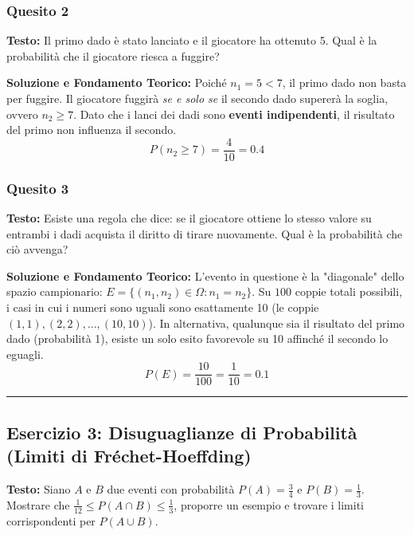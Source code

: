 \documentclass[12pt, a4paper]{article}
\begin{document}
\subsubsection*{Quesito 2}
\textbf{Testo:} Il primo dado è stato lanciato e il giocatore ha ottenuto 5. Qual è la probabilità che il giocatore riesca a fuggire?

\textbf{Soluzione e Fondamento Teorico:} 
Poiché $n_1 = 5 < 7$, il primo dado non basta per fuggire. Il giocatore fuggirà \textit{se e solo se} il secondo dado supererà la soglia, ovvero $n_2 \ge 7$. Dato che i lanci dei dadi sono \textbf{eventi indipendenti}, il risultato del primo non influenza il secondo.
$$ P(n_2 \ge 7) = \frac{4}{10} = 0.4 $$

\subsubsection*{Quesito 3}
\textbf{Testo:} Esiste una regola che dice: se il giocatore ottiene lo stesso valore su entrambi i dadi acquista il diritto di tirare nuovamente. Qual è la probabilità che ciò avvenga?

\textbf{Soluzione e Fondamento Teorico:} 
L'evento in questione è la "diagonale" dello spazio campionario: $E = \{(n_1, n_2) \in \Omega : n_1 = n_2\}$.
Su $100$ coppie totali possibili, i casi in cui i numeri sono uguali sono esattamente 10 (le coppie $(1,1), (2,2), \dots, (10,10)$). In alternativa, qualunque sia il risultato del primo dado (probabilità 1), esiste un solo esito favorevole su 10 affinché il secondo lo eguagli.
$$ P(E) = \frac{10}{100} = \frac{1}{10} = 0.1 $$

\vspace{0.5cm}\hrule\vspace{0.5cm}

\subsection*{Esercizio 3: Disuguaglianze di Probabilità (Limiti di Fréchet-Hoeffding)}
\textbf{Testo:} Siano $A$ e $B$ due eventi con probabilità $P(A)=\frac{3}{4}$ e $P(B)=\frac{1}{3}$. Mostrare che $\frac{1}{12} \le P(A \cap B) \le \frac{1}{3}$, proporre un esempio e trovare i limiti corrispondenti per $P(A \cup B)$.
\end{document}
